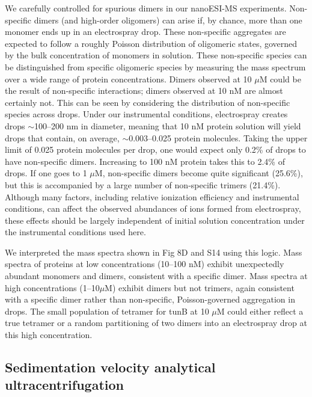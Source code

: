 We carefully controlled for spurious dimers in our nanoESI-MS experiments. Non-specific dimers (and high-order oligomers) can arise if, by chance, more than one monomer ends up in an electrospray drop. These non-specific aggregates are expected to follow a roughly Poisson distribution of oligomeric states, governed by the bulk concentration of monomers in solution. These non-specific species can be distinguished from specific oligomeric species by measuring the mass spectrum over a wide range of protein concentrations. Dimers observed at 10 $\mu$M could be the result of non-specific interactions; dimers observed at 10 nM are almost certainly not. This can be seen by considering the distribution of non-specific species across drops. Under our instrumental conditions, electrospray creates drops $\sim$100--200 nm in diameter, meaning that 10 nM protein solution will yield drops that contain, on average, $\sim$0.003--0.025 protein molecules. Taking the upper limit of 0.025 protein molecules per drop, one would expect only 0.2\% of drops to have non-specific dimers. Increasing to 100 nM protein takes this to 2.4\% of drops. If one goes to 1 $\mu$M, non-specific dimers become quite significant (25.6\%), but this is accompanied by a large number of non-specific trimers (21.4\%). Although many factors, including relative ionization efficiency and instrumental conditions, can affect the observed abundances of ions formed from electrospray, these effects should be largely independent of initial solution concentration under the instrumental conditions used here.

We interpreted the mass spectra shown in Fig 8D and S14 using this logic. Mass spectra of proteins at low concentrations (10--100 nM) exhibit unexpectedly abundant monomers and dimers, consistent with a specific dimer. Mass spectra at high concentrations (1--10$\mu$M) exhibit dimers but not trimers, again consistent with a specific dimer rather than non-specific, Poisson-governed aggregation in drops. The small population of tetramer for tunB at 10 $\mu$M could either reflect a true tetramer or a random partitioning of two dimers into an electrospray drop at this high concentration.

\subsection{Sedimentation velocity analytical ultracentrifugation}

